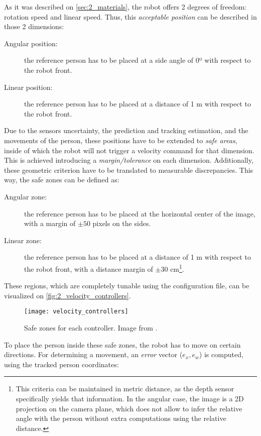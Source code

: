 As it was described on \autoref{sec:2_materials}, the robot offers 2 degrees of freedom: rotation speed and linear speed. Thus, this \textit{acceptable position} can be described in those 2 dimensions:
\begin{description}
	\item[Angular position:] the reference person has to be placed at a side angle of 0º with respect to the robot front.
	\item[Linear position:] the reference person has to be placed at a distance of 1 m with respect to the robot front.
\end{description}

Due to the sensors uncertainty, the prediction and tracking estimation, and the movements of the person, these positions have to be extended to \textit{safe areas}, inside of which the robot will not trigger a velocity command for that dimension. This is achieved introducing a \textit{margin/tolerance} on each dimension. Additionally, these geometric criterion have to be translated to measurable discrepancies. This way, the safe zones can be defined as:

\begin{description}
	\item[Angular zone:] the reference person has to be placed at the horizontal center of the image, with a margin of $\pm 50$ pixels on the sides.
	\item[Linear zone:] the reference person has to be placed at a distance of 1 m with respect to the robot front, with a distance margin of $\pm 30$ cm\footnote{This criteria can be maintained in metric distance, as the depth sensor specifically yields that information. In the angular case, the image is a 2D projection on the camera plane, which does not allow to infer the relative angle with the person without extra computations using the relative distance.}.
\end{description}

These regions, which are completely tunable using the configuration file, can be visualized on \autoref{fig:2_velocity_controllers}.

\begin{figure}[h]
	\centering
	\texttt{[image: velocity\_controllers]}
	\caption{Safe zones for each controller. Image from \cite{tfg}.}
	\label{fig:2_velocity_controllers}
\end{figure}

To place the person inside these safe zones, the robot has to move on certain directions. For determining a movement, an \textit{error} vector ($e_x, e_w$) is computed, using the tracked person coordinates:

